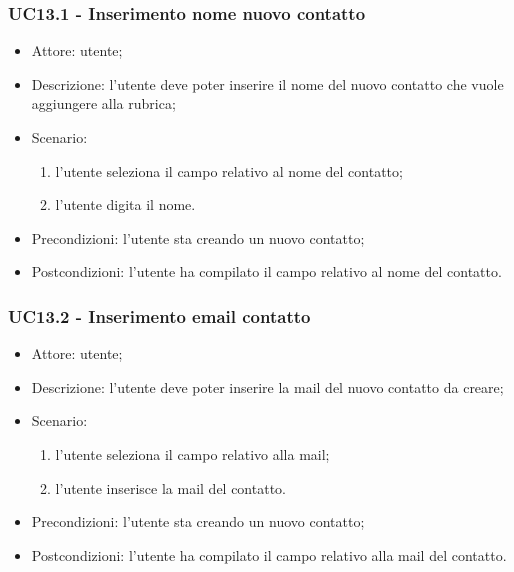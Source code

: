 \subsubsection{UC13.1 - Inserimento nome nuovo contatto} \label{sec: UC13.1}
\begin{itemize}
    \item Attore: utente;
    \item Descrizione: l'utente deve poter inserire il nome del nuovo contatto che vuole aggiungere alla rubrica;
    \item Scenario:
        \begin{enumerate}
        \item l'utente seleziona il campo relativo al nome del contatto;
        \item l'utente digita il nome.
        \end{enumerate}
    
    \item Precondizioni: l'utente sta creando un nuovo contatto;
    \item Postcondizioni: l'utente ha compilato il campo relativo al nome del contatto.
\end{itemize}


\subsubsection{UC13.2 - Inserimento email contatto} \label{sec: UC13.2}
\begin{itemize}
    \item Attore: utente;
    \item Descrizione: l'utente deve poter inserire la mail del nuovo contatto da creare;
    \item Scenario:
        \begin{enumerate}
        \item l'utente seleziona il campo relativo alla mail;
        \item l'utente inserisce la mail del contatto.
        \end{enumerate}
    
    \item Precondizioni: l'utente sta creando un nuovo contatto;
    \item Postcondizioni: l'utente ha compilato il campo relativo alla mail del contatto.
\end{itemize}


